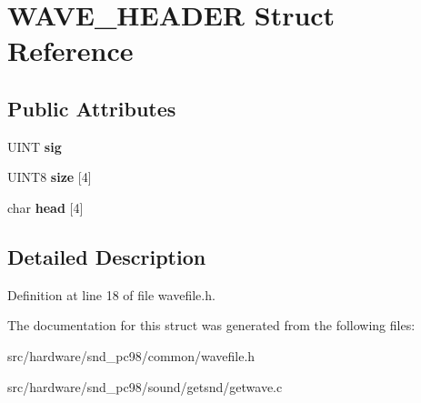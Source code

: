 \hypertarget{structWAVE__HEADER}{\section{W\-A\-V\-E\-\_\-\-H\-E\-A\-D\-E\-R Struct Reference}
\label{structWAVE__HEADER}
}
\subsection*{Public Attributes}
\begin{DoxyCompactItemize}
\item 
\hypertarget{structWAVE__HEADER_ac27573e0b3d48cfbae1f3169ce614dda}{U\-I\-N\-T {\bfseries sig}}\label{structWAVE__HEADER_ac27573e0b3d48cfbae1f3169ce614dda}

\item 
\hypertarget{structWAVE__HEADER_a95460fadd509e17b62525cc924baa31b}{U\-I\-N\-T8 {\bfseries size} \mbox{[}4\mbox{]}}\label{structWAVE__HEADER_a95460fadd509e17b62525cc924baa31b}

\item 
\hypertarget{structWAVE__HEADER_a9c3edee15ea0016e8d89b2762e9e48e1}{char {\bfseries head} \mbox{[}4\mbox{]}}\label{structWAVE__HEADER_a9c3edee15ea0016e8d89b2762e9e48e1}

\end{DoxyCompactItemize}


\subsection{Detailed Description}


Definition at line 18 of file wavefile.\-h.



The documentation for this struct was generated from the following files\-:\begin{DoxyCompactItemize}
\item 
src/hardware/snd\-\_\-pc98/common/wavefile.\-h\item 
src/hardware/snd\-\_\-pc98/sound/getsnd/getwave.\-c\end{DoxyCompactItemize}
